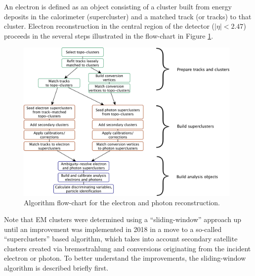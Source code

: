 An electron is defined as an object consisting of a cluster built from energy deposits in the calorimeter (supercluster) and a matched track (or tracks) to that cluster.
Electron reconstruction in the central region of the \ATLAS detector
($|\eta| < 2.47$) proceeds in the several steps illustrated in the flow-chart in Figure \ref{fig:egamma:recoflowchart}.
\begin{figure}[tbp]
  \begin{center}
    \includegraphics[width=0.98\textwidth]{figs/egamma/egammaCodeFlow.png}
  \end{center}
  \caption[Algorithm flow-chart for the electron and photon reconstruction.]
          {Algorithm flow-chart for the electron and photon reconstruction.\cite{EGAM-2018-01}}
  \label{fig:egamma:recoflowchart}
\end{figure}
Note that EM clusters were determined using a ``sliding-window'' approach up until an improvement was implemented in 2018 in a move to a so-called ``superclusters'' based algorithm, which takes into account secondary satellite clusters created via bremsstrahlung and conversions originating from the incident electron or photon.
To better understand the improvements, the sliding-window algorithm is described briefly first.

